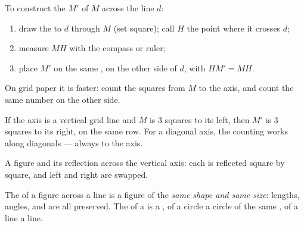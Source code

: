 \begin{method}\label{met:g6:symmetry:construct}
To construct the  $M'$ of $M$ across the line $d$:
\begin{enumerate}
  \item draw the  to $d$ through $M$ (set square); call
        $H$ the point where it crosses $d$;
  \item measure $MH$ with the compass or ruler;
  \item place $M'$ on the same , on the other side of $d$,
        with $HM' = MH$.
\end{enumerate}
On grid paper it is faster: count the squares from $M$ to the axis, and
count the same number on the other side.
\end{method}

\begin{example}[On a grid]\label{ex:g6:symmetry:grid}
If the axis is a vertical grid line and $M$ is $3$ squares to its left,
then $M'$ is $3$ squares to its right, on the same row. For a diagonal
axis, the counting works along diagonals --- always  to
the axis.
\end{example}

\begin{omfigure}

{\small A figure and its reflection across the vertical axis: each
 is reflected square by square, and left and right are swapped.}
\end{omfigure}

\begin{proposition}\label{prop:g6:symmetry:preserved}
The  of a figure across a line is a figure of the \emph{same
shape and same size}: lengths, angles,  and  are all
preserved. The  of a  is a , of a circle a
circle of the same , of a line a line.
\end{proposition}
\admitted

